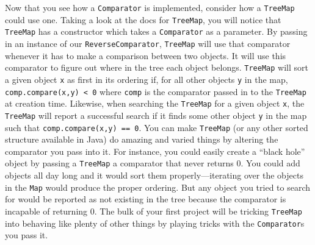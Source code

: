 \documentclass[12pt]{article}
\begin{document}
Now that you see how a \texttt{Comparator} is implemented, consider
how a \texttt{TreeMap} could use one.  Taking a look at the docs for
\texttt{TreeMap}, you will notice that \texttt{TreeMap} has a
constructor which takes a \texttt{Comparator} as a parameter.  By
passing in an instance of our \texttt{ReverseComparator},
\texttt{TreeMap} will use that comparator whenever it has to make a
comparison between two objects.  It will use this comparator to figure
out where in the tree each object belongs.  \texttt{TreeMap} will sort
a given object \texttt{x} as first in its ordering if, for all other
objects \texttt{y} in the map, \texttt{comp.compare(x,y) < 0} where
\texttt{comp} is the comparator passed in to the \texttt{TreeMap} at
creation time.  Likewise, when searching the \texttt{TreeMap} for a
given object \texttt{x}, the \texttt{TreeMap} will report a successful
search if it finds some other object \texttt{y} in the map such that
\texttt{comp.compare(x,y) == 0}.  You can make \texttt{TreeMap} (or
any other sorted structure available in Java) do amazing and varied
things by altering the comparator you pass into it.  For instance, you
could easily create a ``black hole'' object by passing a
\texttt{TreeMap} a comparator that never returns 0.  You could add
objects all day long and it would sort them properly---iterating over
the objects in the \texttt{Map} would produce the proper ordering.
But any object you tried to search for would be reported as not
existing in the tree because the comparator is incapable of returning
0.  The bulk of your first project will be tricking \texttt{TreeMap}
into behaving like plenty of other things by playing tricks with the
\texttt{Comparator}s you pass it. 
\end{document}
